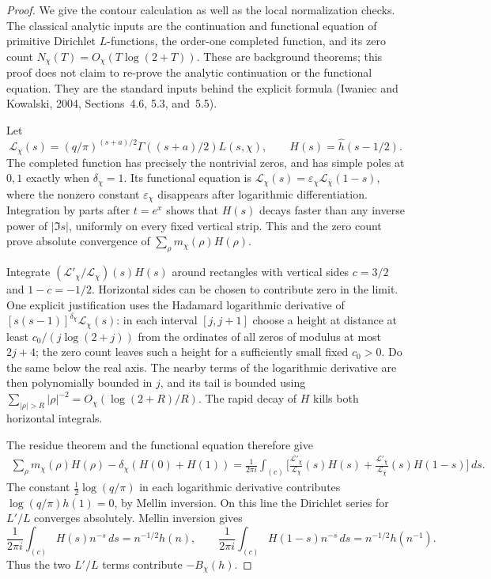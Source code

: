 \begin{proof}
We give the contour calculation as well as the local normalization checks.
The classical analytic inputs are the continuation and functional equation
of primitive Dirichlet $L$-functions, the order-one completed function,
and its zero count $N_\chi(T)=O_\chi(T\log(2+T))$.  These are background
theorems; this proof does not claim to re-prove the analytic continuation
or the functional equation.  They are the standard inputs behind the
explicit formula (Iwaniec and Kowalski, 2004, Sections~4.6, 5.3, and~5.5).

Let
\[
 \mathcal L_\chi(s)=(q/\pi)^{(s+a)/2}
            \Gamma((s+a)/2)L(s,\chi),\qquad H(s)=\widehat h(s-1/2).
\]
The completed function has precisely the nontrivial zeros, and has simple
poles at $0,1$ exactly when $\delta_\chi=1$.  Its functional equation is
$\mathcal L_\chi(s)=\varepsilon_\chi\mathcal L_{\bar\chi}(1-s)$,
where the nonzero constant $\varepsilon_\chi$ disappears after logarithmic
differentiation.  Integration by parts after $t=e^x$ shows that $H(s)$
decays faster than any inverse power of $|\Im s|$, uniformly on every
fixed vertical strip.  This and the zero count prove absolute convergence
of $\sum_\rho m_\chi(\rho)H(\rho)$.

Integrate $(\mathcal L'_\chi/\mathcal L_\chi)(s)H(s)$ around rectangles
with vertical sides $c=3/2$ and $1-c=-1/2$.  Horizontal sides can be chosen
to contribute zero in the limit.  One explicit justification uses the
Hadamard logarithmic derivative of
$[s(s-1)]^{\delta_\chi}\mathcal L_\chi(s)$: in each interval $[j,j+1]$
choose a height at distance at least $c_0/(j\log(2+j))$ from the ordinates
of all zeros of modulus at most $2j+4$; the zero count leaves such a height
for a sufficiently small fixed $c_0>0$.  Do the same below the real axis.
The nearby terms of the logarithmic derivative are then polynomially
bounded in $j$, and its tail is bounded using
$\sum_{|\rho|>R}|\rho|^{-2}=O_\chi(\log(2+R)/R)$.
The rapid decay of $H$ kills both horizontal integrals.

The residue theorem and the functional equation therefore give
\begin{align*}
 \sum_\rho m_\chi(\rho)H(\rho)-\delta_\chi(H(0)+H(1))
 =\frac1{2\pi i}\int_{(c)}\biggl[
 \frac{\mathcal L'_\chi}{\mathcal L_\chi}(s)H(s)
 +\frac{\mathcal L'_{\bar\chi}}{\mathcal L_{\bar\chi}}(s)H(1-s)
 \biggr]\,ds.
\end{align*}
The constant $\tfrac12\log(q/\pi)$ in each logarithmic derivative
contributes $\log(q/\pi)h(1)=0$, by Mellin inversion.  On this line the
Dirichlet series for $L'/L$ converges absolutely.  Mellin inversion gives
\[
 \frac1{2\pi i}\int_{(c)}H(s)n^{-s}\,ds=n^{-1/2}h(n),\qquad
 \frac1{2\pi i}\int_{(c)}H(1-s)n^{-s}\,ds=n^{-1/2}h(n^{-1}).
\]
Thus the two $L'/L$ terms contribute $-B_\chi(h)$.


\end{proof}
